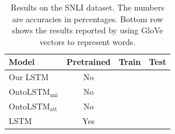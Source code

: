 \begin{table}
    \centering
    \begin{tabular}{|l|c|c|c|}
    \hline
    \textbf{Model} & \textbf{Pretrained } & \textbf{Train} & \textbf{Test}\\
    \hline
    Our LSTM                        & No &  &  \\
    $\text{OntoLSTM}_{\text{uni}}$  & No &  &  \\
    $\text{OntoLSTM}_{\text{att}}$  & No &  &  \\ \hline
    LSTM & Yes &   &  \\
    \hline
    \end{tabular}
    \caption{Results on the SNLI dataset. The numbers are accuracies in percentages. Bottom row shows the results reported by \cite{bowman2016fast} using GloVe vectors to represent words.}
    \label{tab:ontolstm_snli_results}
\end{table}




